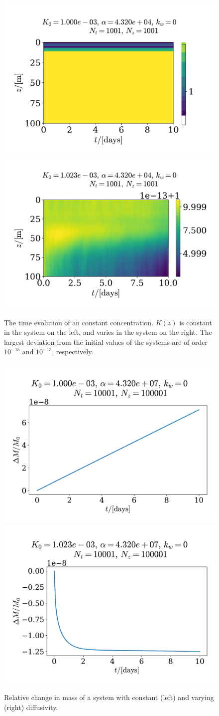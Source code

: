\documentclass{article}
\begin{document}
    \begin{figure}[H]
        \centering
        \includegraphics[width=.49\textwidth]{../plots/test1}
        \includegraphics[width=.49\textwidth]{../plots/test1_varK}
        \caption{The time evolution of an constant concentration.
        $K(z)$ is constant in the system on the left, and varies in the system on the right.
        The largest deviation from the initial values of the systems are of order $10^{-15}$ and $10^{-13}$, respectively.}
        \label{constant_cons}
    \end{figure}

    \begin{figure}[H]
        \centering
        \includegraphics[width=.49\textwidth]{../plots/test2_m}
        \includegraphics[width=.49\textwidth]{../plots/test2_varK_m}
        \caption{Relative change in mass of a system with constant (left) and varying (right) diffusivity.}
        \label{Consv mass}
    \end{figure}
\end{document}

